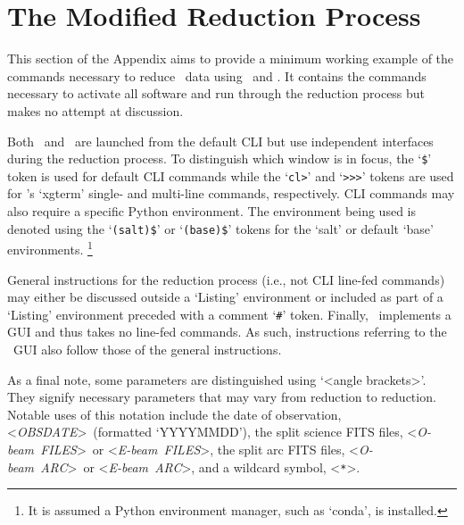 \chapter{The Modified Reduction Process} \label{app:reduction}

\newcommand{\obj}{<\textit{OBJ}>}
\newcommand{\obsdate}{<\textit{OBSDATE}>}

\newcommand{\oarc}{<\textit{O-beam~ARC}>}
\newcommand{\earc}{<\textit{E-beam~ARC}>}
\newcommand{\ofiles}{<\textit{O-beam~FILES}>}
\newcommand{\efiles}{<\textit{E-beam~FILES}>}
\newcommand{\file}{<\textit{FILE(S)}>}

\newcommand{\id}{01\_identify.cl}
\newcommand{\reid}{02\_reidentify.cl}
\newcommand{\fit}{03\_fitcoords.cl}
\newcommand{\tran}{04\_transform.cl}

This section of the Appendix aims to provide a minimum working example of the commands necessary to reduce \polsalt\ data using \stops\ and \iraf. It contains the commands necessary to activate all software and run through the reduction process but makes no attempt at discussion.

Both \polsalt\ and \iraf\ are launched from the default \gls{CLI} but use independent interfaces during the reduction process. To distinguish which window is in focus, the `\texttt{\$}' token is used for default \gls{CLI} commands while the `\texttt{cl>}' and `\texttt{>\->\->}' tokens are used for \iraf's `xgterm' single- and multi-line commands, respectively. \gls{CLI} commands may also require a specific Python environment. The environment being used is denoted using the `\texttt{(salt)\$}' or `\texttt{(base)\$}' tokens for the `salt' or default `base' environments.%
\footnote{It is assumed a Python environment manager, such as `conda', is installed.}

General instructions for the reduction process (i.e., not \gls{CLI} line-fed commands) may either be discussed outside a `Listing' environment or included as part of a `Listing' environment preceded with a comment `\texttt{\#}' token. Finally, \polsalt\ implements a \gls{GUI} and thus takes no line-fed commands. As such, instructions referring to the \polsalt\ \gls{GUI} also follow those of the general instructions.

As a final note, some parameters are distinguished using `<angle brackets>'. They signify necessary parameters that may vary from reduction to reduction. Notable uses of this notation include the date of observation, \obsdate\ (formatted `YYYYMMDD'), the split science \gls{FITS} files, \ofiles\ or \efiles, the split arc \gls{FITS} files, \oarc\ or \earc, and a wildcard symbol, <\texttt{*}>.

